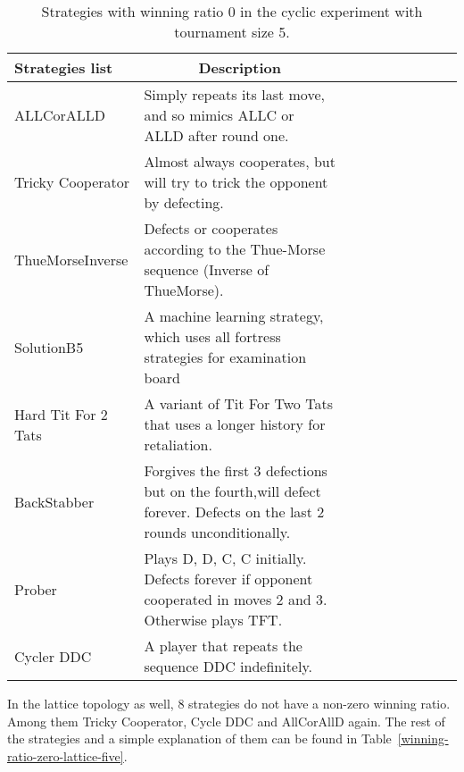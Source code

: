 \begin{table}[h]
	\centering
	\begin{adjustbox}{width=1\textwidth}
		\small
		\begin{tabular}{@{}|l|l|l|l|l|l|l|l|l|l|@{}}
			\hline
			Strategies list     & \multicolumn{1}{c|}{Description}                                                                                     \\ \hline
			ALLCorALLD          & Simply repeats its last move, and so mimics ALLC or ALLD after round one.                                            \\ \hline
			Tricky Cooperator   & Almost always cooperates, but will try to trick the opponent by defecting.                                           \\ \hline
			ThueMorseInverse    & Defects or cooperates according to the Thue-Morse sequence (Inverse of ThueMorse).                                   \\ \hline
			SolutionB5          & A machine learning strategy, which uses all fortress strategies for examination board                                \\ \hline
			Hard Tit For 2 Tats & A variant of Tit For Two Tats that uses a longer history for retaliation.                                            \\ \hline
			BackStabber         & Forgives the first 3 defections but on the fourth,will defect forever. Defects on the last 2 rounds unconditionally. \\ \hline
			Prober              & Plays D, D, C, C initially. Defects forever if opponent cooperated in moves 2 and 3. Otherwise plays TFT.            \\ \hline
			Cycler DDC          & A player that repeats the sequence DDC indefinitely.                                                                 \\ \hline
		\end{tabular}
	\end{adjustbox}
	\caption{Strategies with winning ratio 0 in the cyclic experiment with tournament
	size 5.}
	\label{winning-ratio-zero-cyclic-five}
\end{table}

In the lattice topology as well, 8 strategies do not have
a non-zero winning ratio. Among them Tricky Cooperator, Cycle DDC and AllCorAllD
again. The rest of the strategies and a simple explanation of them can be found in
Table~\ref{winning-ratio-zero-lattice-five}.

